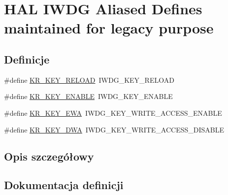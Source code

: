 \hypertarget{group___h_a_l___i_w_d_g___aliased___defines}{}\section{H\+AL I\+W\+DG Aliased Defines maintained for legacy purpose}
\label{group___h_a_l___i_w_d_g___aliased___defines}
\subsection*{Definicje}
\begin{DoxyCompactItemize}
\item 
\#define \hyperlink{group___h_a_l___i_w_d_g___aliased___defines_ga830a9a1bad16c7043c86545f4c159a50}{K\+R\+\_\+\+K\+E\+Y\+\_\+\+R\+E\+L\+O\+AD}~I\+W\+D\+G\+\_\+\+K\+E\+Y\+\_\+\+R\+E\+L\+O\+AD
\item 
\#define \hyperlink{group___h_a_l___i_w_d_g___aliased___defines_gaeaa0dd2da3f9d0cce0d708cfff1df545}{K\+R\+\_\+\+K\+E\+Y\+\_\+\+E\+N\+A\+B\+LE}~I\+W\+D\+G\+\_\+\+K\+E\+Y\+\_\+\+E\+N\+A\+B\+LE
\item 
\#define \hyperlink{group___h_a_l___i_w_d_g___aliased___defines_gadf1ad39b6aa3d426f6e7fbf29d088aa5}{K\+R\+\_\+\+K\+E\+Y\+\_\+\+E\+WA}~I\+W\+D\+G\+\_\+\+K\+E\+Y\+\_\+\+W\+R\+I\+T\+E\+\_\+\+A\+C\+C\+E\+S\+S\+\_\+\+E\+N\+A\+B\+LE
\item 
\#define \hyperlink{group___h_a_l___i_w_d_g___aliased___defines_gae9cf62ac0d5eda2dd2417c280237e446}{K\+R\+\_\+\+K\+E\+Y\+\_\+\+D\+WA}~I\+W\+D\+G\+\_\+\+K\+E\+Y\+\_\+\+W\+R\+I\+T\+E\+\_\+\+A\+C\+C\+E\+S\+S\+\_\+\+D\+I\+S\+A\+B\+LE
\end{DoxyCompactItemize}


\subsection{Opis szczegółowy}


\subsection{Dokumentacja definicji}
\mbox{\label{group___h_a_l___i_w_d_g___aliased___defines_gae9cf62ac0d5eda2dd2417c280237e446}} 
